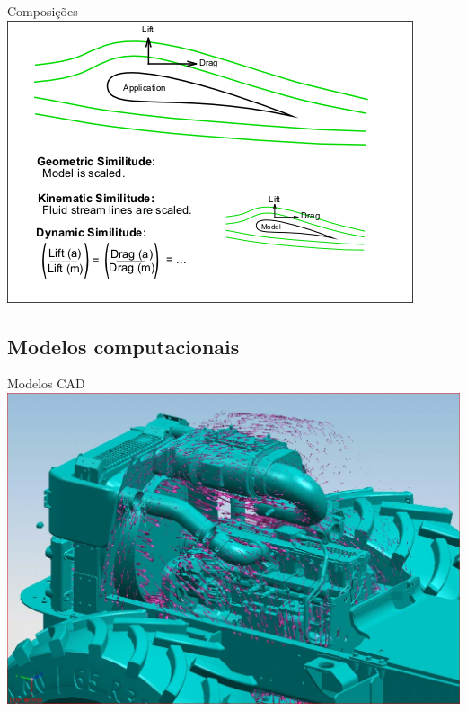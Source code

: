 \documentclass{beamer}
\begin{document}
\begin{frame}{Composições}
  \centering
  \includegraphics[width=.8\textwidth]{modelos/Similitude_(model)}
\end{frame}

\subsection{Modelos computacionais}

\begin{frame}{Modelos CAD}
  \centering
  \includegraphics[width=\textwidth]{modelos/Ugs-nx-5-engine-airflow-simulation}
\end{frame}
\end{document}
